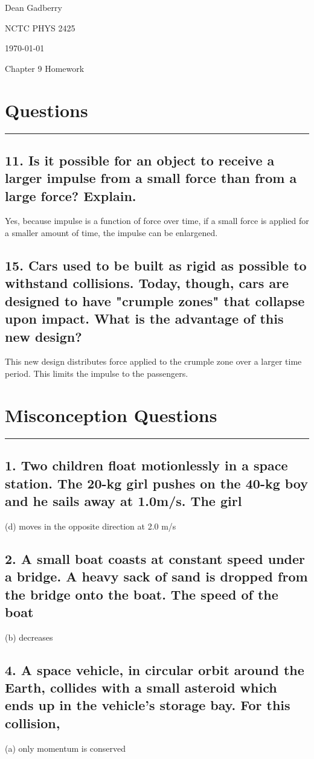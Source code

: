 \documentclass[12pt,a4paper,english]{article}
\begin{document}
\begin{flushright}
  Dean Gadberry

  NCTC PHYS 2425

  \today
\end{flushright}
\begin{center}
  {\large Chapter 9 Homework}
\end{center}
\begin{flushleft}

  \section*{Questions}
  \hrule
  \subsection{11. Is it possible for an object to receive a larger impulse from a small force than from a large force? Explain.}
  Yes, because impulse is a function of force over time, if a small force is applied for a smaller amount of time, the impulse can be enlargened.
  \subsection{15. Cars used to be built as rigid as possible to withstand collisions. Today, though, cars are designed to have "crumple zones" that collapse upon impact. What is the advantage of this new design?}
  This new design distributes force applied to the crumple zone over a larger time period. This limits the impulse to the passengers.

  \section*{Misconception Questions}
  \hrule
  \subsection{1. Two children float motionlessly in a space station. The 20-kg girl pushes on the 40-kg boy and he sails away at 1.0m/s. The girl}
  (d) moves in the opposite direction at 2.0 m/s
  \subsection{2. A small boat coasts at constant speed under a bridge. A heavy sack of sand is dropped from the bridge onto the boat. The speed of the boat}
  (b) decreases
  \subsection{4. A space vehicle, in circular orbit around the Earth, collides with a small asteroid which ends up in the vehicle's storage bay. For this collision, }
  (a) only momentum is conserved

\end{flushleft}
\end{document}
